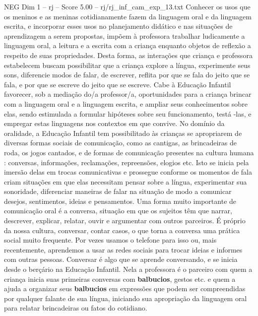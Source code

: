 \begin{textsample}{NEG Dim 1 – rj – Score 5.00 – rj/rj\_inf\_cam\_exp\_13.txt}
Conhecer os usos que os meninos e as meninas cotidianamente fazem da linguagem oral e da linguagem escrita, e incorporar esses usos no planejamento didático e nas situações de aprendizagem a serem propostas, impõem à professora trabalhar ludicamente a linguagem oral, a leitura e a escrita com a criança enquanto objetos de reflexão a respeito de suas propriedades.
Desta forma, as interações que criança e professora estabelecem buscam possibilitar que a criança explore a língua, experimente seus sons, diferencie modos de falar, de escrever, reflita por que se fala do jeito que se fala, e por que se escreve do jeito que se escreve.
Cabe à Educação Infantil favorecer, sob a mediação do/a professor/a, oportunidades para a criança brincar com a linguagem oral e a linguagem escrita, e ampliar seus conhecimentos sobre elas, sendo estimulada a formular hipóteses sobre seu funcionamento, testá -las, e empregar estas linguagens nos contextos em que convive.
No domínio da oralidade, a Educação Infantil tem possibilitado às crianças se apropriarem de diversas formas sociais de comunicação, como as cantigas, as brincadeiras de roda, os jogos cantados, e de formas de comunicação presentes na cultura humana : conversas, informações, reclamações, repreensões, elogios etc.
Isto se inicia pela imersão delas em trocas comunicativas e prossegue conforme os momentos de fala criam situações em que elas necessitam pensar sobre a língua, experimentar sua sonoridade, diferenciar maneiras de falar na situação de modo a comunicar desejos, sentimentos, ideias e pensamentos.
Uma forma muito importante de comunicação oral é a conversa, situação em que os sujeitos têm que narrar, descrever, explicar, relatar, ouvir e argumentar com outros parceiros.
É próprio da nossa cultura, conversar, contar casos, o que torna a conversa uma prática social muito frequente.
Por vezes usamos o telefone para isso ou, mais recentemente, aprendemos a usar as redes sociais para trocar ideias e informes com outras pessoas.
Conversar é algo que se aprende conversando, e se inicia desde o berçário na Educação Infantil.
Nela a professora é o parceiro com quem a criança inicia suas primeiras conversas com \textbf{balbucios}, gestos etc. e quem a ajuda a organizar seus \textbf{balbucios} em expressões que podem ser compreendidas por qualquer falante de sua língua, iniciando sua apropriação da linguagem oral para relatar brincadeiras ou fatos do cotidiano.

\end{textsample}
